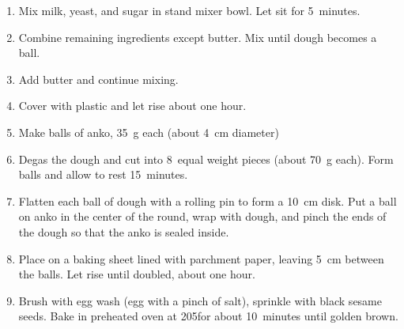 
\begin{ingredients}
\end{ingredients}


\begin{recipe}
  \begin{enumerate}

  \item Mix milk, yeast, and sugar in stand mixer bowl.  Let sit for 5~minutes.
    
  \item Combine remaining ingredients except butter.  Mix until dough becomes a ball.

  \item Add butter and continue mixing.
    
  \item Cover with plastic and let rise about one hour.
    
  \item Make balls of anko, 35~g each (about 4~cm diameter)
    
  \item Degas the dough and cut into 8~equal weight pieces (about 70~g
    each).  Form balls and allow to rest 15~minutes.
    
  \item Flatten each ball of dough with a rolling pin to form a 10~cm
    disk.  Put a ball on anko in the center of the round, wrap with
    dough, and pinch the ends of the dough so that the anko is sealed
    inside.
    
  \item Place on a baking sheet lined with parchment paper, leaving
    5~cm between the balls.  Let rise until doubled, about one hour.
    
  \item Brush with egg wash (egg with a pinch of salt), sprinkle with
    black sesame seeds.  Bake in preheated oven at 205\degreeC for
    about 10~minutes until golden brown.


  \end{enumerate}
\end{recipe}


